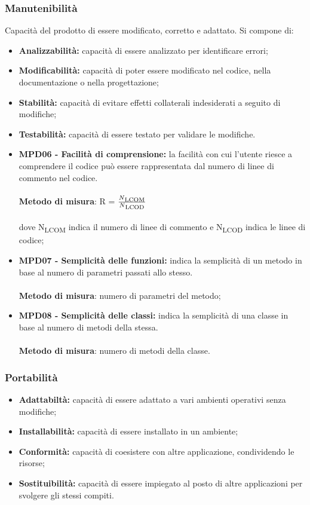 \subsubsection{Manutenibilità}
Capacità del prodotto di essere modificato, corretto e adattato. Si compone di:
\begin{itemize}
    \item \textbf{Analizzabilità: }capacità di essere analizzato per identificare errori;
    \item \textbf{Modificabilità: }capacità di poter essere modificato nel codice, nella documentazione o nella progettazione;
    \item \textbf{Stabilità: }capacità di evitare effetti collaterali indesiderati a seguito di modifiche;
    \item \textbf{Testabilità: }capacità di essere testato per validare le modifiche.
\end{itemize}
\begin{itemize}
    \item \textbf{MPD06 - Facilità di comprensione:} la facilità con cui l'utente riesce a comprendere il codice può essere rappresentata dal numero di linee di commento nel codice.\\
          \\\textbf{Metodo di misura}: R = $\frac{N\textsubscript{LCOM}}{N\textsubscript{LCOD}}$ \\
          \\dove N\textsubscript{LCOM} indica il numero di linee di commento e N\textsubscript{LCOD} indica le linee di codice;
    \item \textbf{MPD07 - Semplicità delle funzioni:} indica la semplicità di un metodo in base al numero di parametri passati allo stesso.\\
          \\\textbf{Metodo di misura}: numero di parametri del metodo;
    \item \textbf{MPD08 - Semplicità delle classi:}  indica la semplicità di una classe in base al numero di metodi della stessa.\\
          \\\textbf{Metodo di misura}: numero di metodi della classe.
\end{itemize}
\subsubsection{Portabilità}
\begin{itemize}
    \item \textbf{Adattabiltà: }capacità di essere adattato a vari ambienti operativi senza modifiche;
    \item \textbf{Installabilità: }capacità di essere installato in un ambiente;
    \item \textbf{Conformità: }capacità di coesistere con altre applicazione, condividendo le risorse;
    \item \textbf{Sostituibilità: }capacità di essere impiegato al posto di altre applicazioni per svolgere gli stessi compiti.
\end{itemize}








